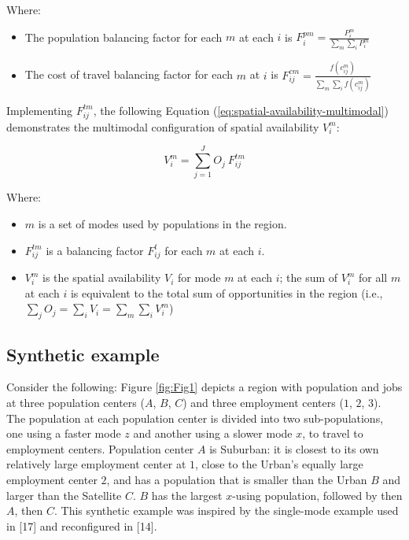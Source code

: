 \documentclass[10pt,letterpaper]{article}
\providecommand{\tightlist}{%
  \setlength{\itemsep}{0pt}\setlength{\parskip}{0pt}}
\begin{document}
\noindent Where:

\begin{itemize}
\tightlist
\item
  The population balancing factor for each \(m\) at each \(i\) is
  \(F^{pm}_{i} = \frac{P_{i}^m}{\sum_{m}\sum_{i} P_{i}^m}\)
\item
  The cost of travel balancing factor for each \(m\) at \(i\) is
  \(F_{ij}^{cm} = \frac{f(c_{ij}^m)}{\sum_{m} \sum_{i} f(c_{ij}^m)}\)
\end{itemize}

Implementing \(F^{tm}_{ij}\), the following Equation
(\ref{eq:spatial-availability-multimodal}) demonstrates the multimodal
configuration of spatial availability \(V_i^m\):

\begin{equation}
\label{eq:spatial-availability-multimodal}
V^m_{i} = \sum_{j=1}^J O_j\ F^{tm}_{ij}
\end{equation}

\noindent Where:

\begin{itemize}
\tightlist
\item
  \(m\) is a set of modes used by populations in the region.
\item
  \(F^{tm}_{ij}\) is a balancing factor \(F^t_{ij}\) for each \(m\) at
  each \(i\).
\item
  \(V^m_{i}\) is the spatial availability \(V_{i}\) for mode \(m\) at
  each \(i\); the sum of \(V^m_{i}\) for all \(m\) at each \(i\) is
  equivalent to the total sum of opportunities in the region (i.e.,
  \(\sum_j O_j = \sum_i V_i = \sum_{m} \sum_{i} V^m_{i}\))
\end{itemize}

\hypertarget{synthetic-example}{%
\subsection{Synthetic example}\label{synthetic-example}}

Consider the following: Figure \ref{fig:Fig1} depicts a region with
population and jobs at three population centers (\(A\), \(B\), \(C\))
and three employment centers (\(1\), \(2\), \(3\)). The population at
each population center is divided into two sub-populations, one using a
faster mode \(z\) and another using a slower mode \(x\), to travel to
employment centers. Population center \(A\) is Suburban: it is closest
to its own relatively large employment center at \(1\), close to the
Urban's equally large employment center \(2\), and has a population that
is smaller than the Urban \(B\) and larger than the Satellite \(C\).
\(B\) has the largest \(x\)-using population, followed by then \(A\),
then \(C\). This synthetic example was inspired by the single-mode
example used in {[}17{]} and reconfigured in {[}14{]}.
\end{document}
